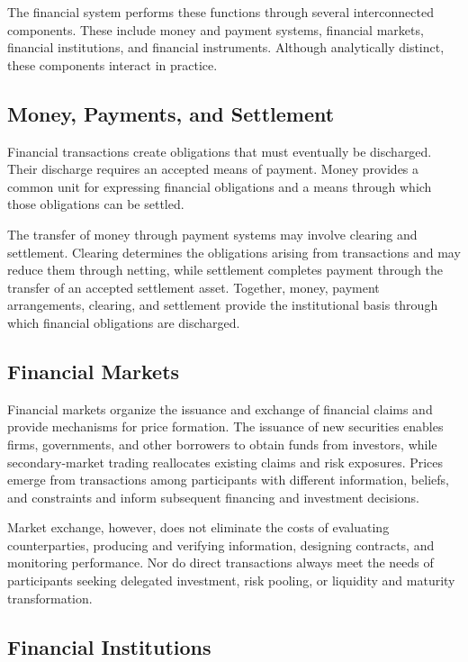 The financial system performs these functions through several interconnected components. These include money and payment systems, financial markets, financial institutions, and financial instruments. Although analytically distinct, these components interact in practice.

\subsection{Money, Payments, and Settlement}

Financial transactions create obligations that must eventually be discharged. Their discharge requires an accepted means of payment. Money provides a common unit for expressing financial obligations and a means through which those obligations can be settled.

The transfer of money through payment systems may involve clearing and settlement. Clearing determines the obligations arising from transactions and may reduce them through netting, while settlement completes payment through the transfer of an accepted settlement asset. Together, money, payment arrangements, clearing, and settlement provide the institutional basis through which financial obligations are discharged.

\subsection{Financial Markets}

Financial markets organize the issuance and exchange of financial claims and provide mechanisms for price formation. The issuance of new securities enables firms, governments, and other borrowers to obtain funds from investors, while secondary-market trading reallocates existing claims and risk exposures. Prices emerge from transactions among participants with different information, beliefs, and constraints and inform subsequent financing and investment decisions.

Market exchange, however, does not eliminate the costs of evaluating counterparties, producing and verifying information, designing contracts, and monitoring performance. Nor do direct transactions always meet the needs of participants seeking delegated investment, risk pooling, or liquidity and maturity transformation. 

\subsection{Financial Institutions}

